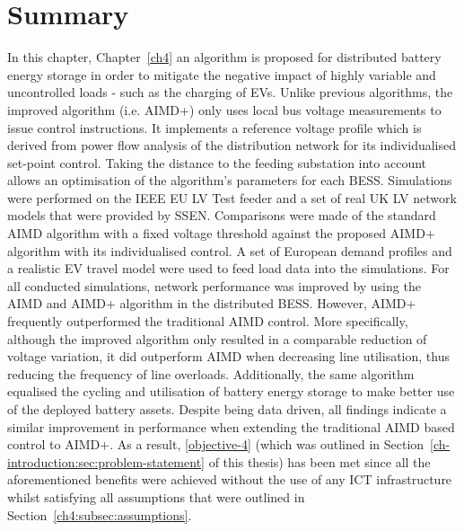 \section{Summary}
\label{ch4:sec:summary}

In this chapter, Chapter~\ref{ch4} an algorithm is proposed for distributed battery energy storage in order to mitigate the negative impact of highly variable and uncontrolled loads - such as the charging of EVs.
Unlike previous algorithms, the improved algorithm (i.e. AIMD+) only uses local bus voltage measurements to issue control instructions.
It implements a reference voltage profile which is derived from power flow analysis of the distribution network for its individualised set-point control.
Taking the distance to the feeding substation into account allows an optimisation of the algorithm's parameters for each BESS.
Simulations were performed on the IEEE EU LV Test feeder and a set of real UK LV network models that were provided by SSEN.
Comparisons were made of the standard AIMD algorithm with a fixed voltage threshold against the proposed AIMD+ algorithm with its individualised control.
A set of European demand profiles and a realistic EV travel model were used to feed load data into the simulations.
For all conducted simulations, network performance was improved by using the AIMD and AIMD+ algorithm in the distributed BESS.
However, AIMD+ frequently outperformed the traditional AIMD control.
More specifically, although the improved algorithm only resulted in a comparable reduction of voltage variation, it did outperform AIMD when decreasing line utilisation, thus reducing the frequency of line overloads.
Additionally, the same algorithm equalised the cycling and utilisation of battery energy storage to make better use of the deployed battery assets.
Despite being data driven, all findings indicate a similar improvement in performance when extending the traditional AIMD based control to AIMD+.
As a result, \ref{objective-4} (which was outlined in Section~\ref{ch-introduction:sec:problem-statement} of this thesis) has been met since all the aforementioned benefits were achieved without the use of any ICT infrastructure whilst satisfying all assumptions that were outlined in Section~\ref{ch4:subsec:assumptions}.

